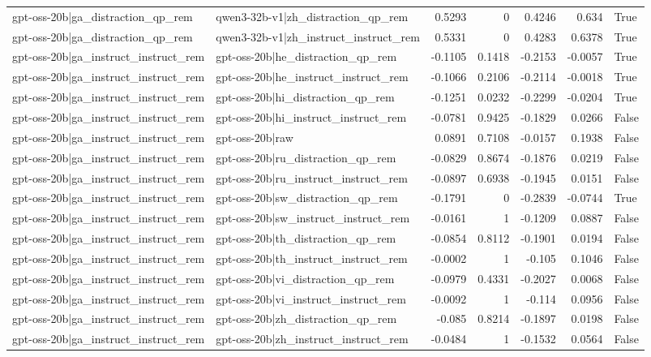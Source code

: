 \begin{table}
\begin{tabular}{l l r r r r l}
gpt-oss-20b|ga_distraction_qp_rem & qwen3-32b-v1|zh_distraction_qp_rem & 0.5293 & 0 & 0.4246 & 0.634 & True \\
gpt-oss-20b|ga_distraction_qp_rem & qwen3-32b-v1|zh_instruct_instruct_rem & 0.5331 & 0 & 0.4283 & 0.6378 & True \\
gpt-oss-20b|ga_instruct_instruct_rem & gpt-oss-20b|he_distraction_qp_rem & -0.1105 & 0.1418 & -0.2153 & -0.0057 & True \\
gpt-oss-20b|ga_instruct_instruct_rem & gpt-oss-20b|he_instruct_instruct_rem & -0.1066 & 0.2106 & -0.2114 & -0.0018 & True \\
gpt-oss-20b|ga_instruct_instruct_rem & gpt-oss-20b|hi_distraction_qp_rem & -0.1251 & 0.0232 & -0.2299 & -0.0204 & True \\
gpt-oss-20b|ga_instruct_instruct_rem & gpt-oss-20b|hi_instruct_instruct_rem & -0.0781 & 0.9425 & -0.1829 & 0.0266 & False \\
gpt-oss-20b|ga_instruct_instruct_rem & gpt-oss-20b|raw & 0.0891 & 0.7108 & -0.0157 & 0.1938 & False \\
gpt-oss-20b|ga_instruct_instruct_rem & gpt-oss-20b|ru_distraction_qp_rem & -0.0829 & 0.8674 & -0.1876 & 0.0219 & False \\
gpt-oss-20b|ga_instruct_instruct_rem & gpt-oss-20b|ru_instruct_instruct_rem & -0.0897 & 0.6938 & -0.1945 & 0.0151 & False \\
gpt-oss-20b|ga_instruct_instruct_rem & gpt-oss-20b|sw_distraction_qp_rem & -0.1791 & 0 & -0.2839 & -0.0744 & True \\
gpt-oss-20b|ga_instruct_instruct_rem & gpt-oss-20b|sw_instruct_instruct_rem & -0.0161 & 1 & -0.1209 & 0.0887 & False \\
gpt-oss-20b|ga_instruct_instruct_rem & gpt-oss-20b|th_distraction_qp_rem & -0.0854 & 0.8112 & -0.1901 & 0.0194 & False \\
gpt-oss-20b|ga_instruct_instruct_rem & gpt-oss-20b|th_instruct_instruct_rem & -0.0002 & 1 & -0.105 & 0.1046 & False \\
gpt-oss-20b|ga_instruct_instruct_rem & gpt-oss-20b|vi_distraction_qp_rem & -0.0979 & 0.4331 & -0.2027 & 0.0068 & False \\
gpt-oss-20b|ga_instruct_instruct_rem & gpt-oss-20b|vi_instruct_instruct_rem & -0.0092 & 1 & -0.114 & 0.0956 & False \\
gpt-oss-20b|ga_instruct_instruct_rem & gpt-oss-20b|zh_distraction_qp_rem & -0.085 & 0.8214 & -0.1897 & 0.0198 & False \\
gpt-oss-20b|ga_instruct_instruct_rem & gpt-oss-20b|zh_instruct_instruct_rem & -0.0484 & 1 & -0.1532 & 0.0564 & False \\

\end{tabular}
\end{table}
